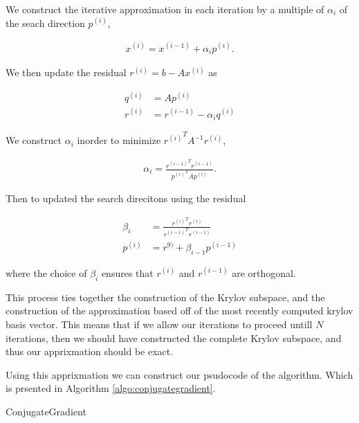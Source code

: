 \documentclass[../fem.tex]{subfiles}
\begin{document}
We construct the iterative approximation in each iteration by a multiple of
$\alpha_i$ of the seach direction $p^{(i)}$,

\begin{align*}
  x^{(i)}=x^{(i-1)}+\alpha_ip^{(i)}.
\end{align*}

We then update the residual $r^{(i)}=b-Ax^{(i)}$ as

\begin{align*}
  q^{(i)}&=Ap^{(i)}\\
  r^{(i)}&=r^{(i-1)}-\alpha_i q^{(i)}
\end{align*}

We construct $\alpha_i$ inorder to minimize ${r^{(i)}}^TA^{-1}r^{(i)}$,

\begin{align*}
  \alpha_i=\frac{{r^{(i-1)}}^Tr^{(i-1)}}{{p^{(i)}}^TAp^{(i)}}.
\end{align*}

Then to updated the search direcitons using the residual

\begin{align*}
  \beta_i&=\frac{{r^{(i)}}^Tr^{(i)}}{{r^{(i-1)}}^Tr^{(i-1)}}\\
  p^{(i)}&=r^{9)}+\beta_{i-1}p^{(i-1)}
\end{align*}

where the choice of $\beta_i$ ensures that $r^{(i)}$ and $r^{(i-1)}$ are
orthogonal.

This process ties together the construction of the Krylov subspace, and the
construction of the approximation based off of the most recently computed
krylov basis vector. This means that if we allow our iterations to proceed
untill $N$ iterations, then we should have constructed the complete Krylov
subspace, and thus our apprixmation should be exact.

Using this apprixmation we can construct our psudocode of the algorithm. Which
is prsented in Algorithm \ref{algo:conjugategradient}.

\begin{algorithm}[H]
  \caption{ConjugateGradient}\label{algo:conjugategradient}
  \begin{algorithmic}
    \Else
    \EndIf
    \EndIf
    \EndFor
  \end{algorithmic}
\end{algorithm}
\end{document}
